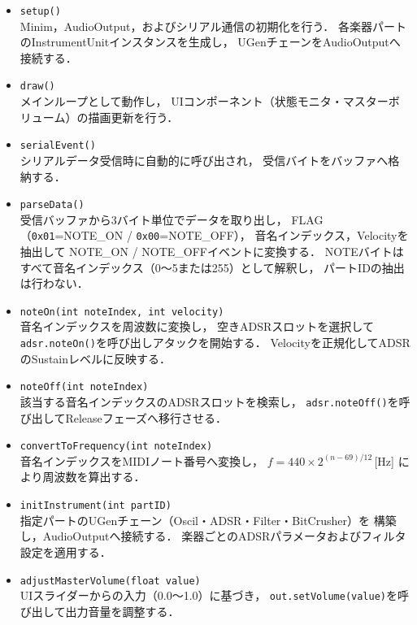 \documentclass[lualatex,book,paper=a4paper,jafontsize=11.5pt,jafontscale=1.05,oneside]{jlreq}
\begin{document}
\begin{itemize}

  \item \texttt{setup()} \\
  Minim，AudioOutput，およびシリアル通信の初期化を行う．
  各楽器パートのInstrumentUnitインスタンスを生成し，
  UGenチェーンをAudioOutputへ接続する．

  \item \texttt{draw()} \\
  メインループとして動作し，
  UIコンポーネント（状態モニタ・マスターボリューム）の描画更新を行う．

  \item \texttt{serialEvent()} \\
  シリアルデータ受信時に自動的に呼び出され，
  受信バイトをバッファへ格納する．

  \item \texttt{parseData()} \\
  受信バッファから3バイト単位でデータを取り出し，
  FLAG（\texttt{0x01}=NOTE\_ON / \texttt{0x00}=NOTE\_OFF），
  音名インデックス，Velocityを抽出して
  NOTE\_ON / NOTE\_OFFイベントに変換する．
  NOTEバイトはすべて音名インデックス（0〜5または255）として解釈し，
  パートIDの抽出は行わない．

  \item \texttt{noteOn(int noteIndex, int velocity)} \\
  音名インデックスを周波数に変換し，
  空きADSRスロットを選択して\texttt{adsr.noteOn()}を呼び出しアタックを開始する．
  Velocityを正規化してADSRのSustainレベルに反映する．

  \item \texttt{noteOff(int noteIndex)} \\
  該当する音名インデックスのADSRスロットを検索し，
  \texttt{adsr.noteOff()}を呼び出してReleaseフェーズへ移行させる．

  \item \texttt{convertToFrequency(int noteIndex)} \\
  音名インデックスをMIDIノート番号へ変換し，
  $f = 440 \times 2^{(n-69)/12}$\,[Hz] により周波数を算出する．

  \item \texttt{initInstrument(int partID)} \\
  指定パートのUGenチェーン（Oscil・ADSR・Filter・BitCrusher）を
  構築し，AudioOutputへ接続する．
  楽器ごとのADSRパラメータおよびフィルタ設定を適用する．

  \item \texttt{adjustMasterVolume(float value)} \\
  UIスライダーからの入力（0.0〜1.0）に基づき，
  \texttt{out.setVolume(value)}を呼び出して出力音量を調整する．

\end{itemize}
\end{document}
